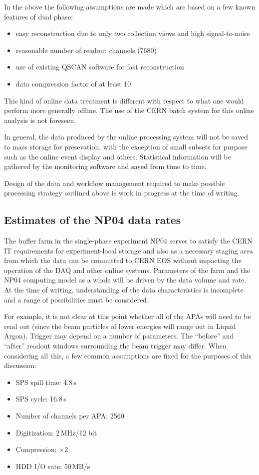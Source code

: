 \documentclass[pdftex,12pt,letter]{article}
\begin{document}
In the above the following assumptions are made which are based on a few known features of dual phase:
\begin{itemize}
\item easy reconstruction due to only two collection views and high signal-to-noise
\item reasonable number of readout channels (7680)
\item use of existing QSCAN software for fast reconstruction
\item data compression factor of at least 10
\end{itemize}

\noindent This kind of online data treatment is  different with respect to what one would perform
more generally offline. The use of the CERN batch system for this online analysis is not foreseen.

In general, the data produced by the online processing system will not be saved to mass storage for presevation, with
the exception of small subsets for purpose such as the online event display and others. Statistical information will be gathered by
the monitoring software and saved from time to time.

Design of the data and workflow management required to make possible processing strategy outlined above is work in progress
at the time of writing.

\subsection{Estimates of the NP04 data rates}
\label{sec:np04_data_rate}
The buffer farm in the single-phase experiment NP04 serves to satisfy
the CERN IT requirements for experiment-local storage and also as a necessary
staging area from which the data can be committed to CERN EOS without impacting the operation
of the DAQ and other online systems. Parameters of the farm and the NP04 computing model
as a whole will be driven
by the data volume and rate. At the time of writing, understanding of the data characteristics is incomplete
and a range of possibilities must be considered.

For example, it is not clear at this point whether all of the APAs will need to be read out (since the beam
particles of lower energies will range out in Liquid Argon). Trigger may depend on a number of parameters.
The ``before'' and ``after'' readout windows surrounding the beam trigger may differ. When considering
all this, a few common assumptions are fixed for the purposes of this discussion:
\begin{itemize}
\item SPS spill time: 4.8\,s
\item SPS cycle: 16.8\,s
\item Number of channels per APA: 2560
\item Digitization: 2\,MHz/12 bit
\item Compression: $\times$2
\item HDD I/O rate: 50\,MB/s
\end{itemize}
\end{document}
